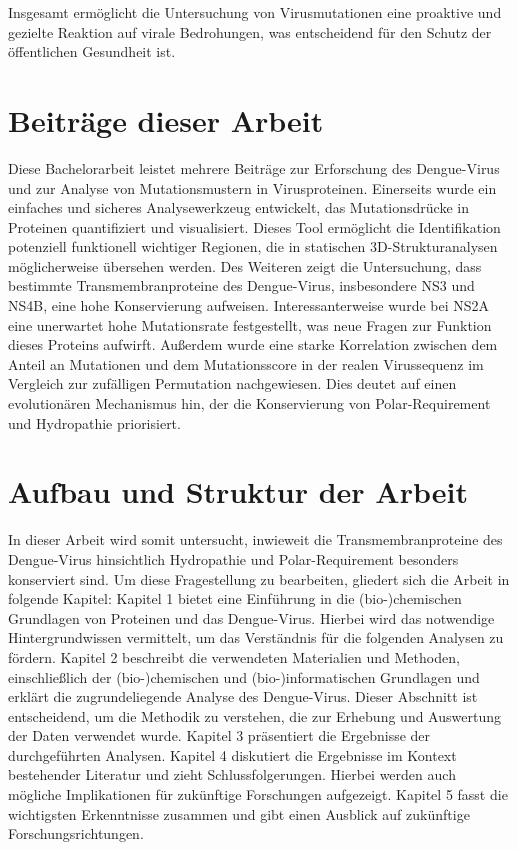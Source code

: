 \documentclass[german,version-2022-01]{uzl-thesis}
\begin{document}
Insgesamt erm\"oglicht die Untersuchung von Virusmutationen eine proaktive und gezielte Reaktion auf virale Bedrohungen, was entscheidend f\"ur den Schutz der \"offentlichen Gesundheit ist.

\section{Beitr\"age dieser Arbeit} 
Diese Bachelorarbeit leistet mehrere Beitr\"age zur Erforschung des Dengue-Virus und zur Analyse von Mutationsmustern in Virusproteinen. Einerseits wurde ein einfaches und sicheres Analysewerkzeug entwickelt, das Mutationsdr\"ucke in Proteinen quantifiziert und visualisiert. Dieses Tool erm\"oglicht die Identifikation potenziell funktionell wichtiger Regionen, die in statischen 3D-Strukturanalysen m\"oglicherweise \"ubersehen werden. Des Weiteren zeigt die Untersuchung, dass bestimmte Transmembranproteine des Dengue-Virus, insbesondere NS3 und NS4B, eine hohe Konservierung aufweisen. Interessanterweise wurde bei NS2A eine unerwartet hohe Mutationsrate festgestellt, was neue Fragen zur Funktion dieses Proteins aufwirft. Au\ss{}erdem wurde eine starke Korrelation zwischen dem Anteil an Mutationen und dem Mutationsscore in der realen Virussequenz im Vergleich zur zuf\"alligen Permutation nachgewiesen. Dies deutet auf einen evolution\"aren Mechanismus hin, der die Konservierung von Polar-Requirement und Hydropathie priorisiert. 

\section{Aufbau und Struktur der Arbeit}
In dieser Arbeit wird somit untersucht, inwieweit die Transmembranproteine des Dengue-Virus hinsichtlich Hydropathie und Polar-Requirement besonders konserviert sind. Um diese Fragestellung zu bearbeiten, gliedert sich die Arbeit in folgende Kapitel: Kapitel 1 bietet eine Einf\"uhrung in die (bio-)chemischen Grundlagen von Proteinen und das Dengue-Virus. Hierbei wird das notwendige Hintergrundwissen vermittelt, um das Verst\"andnis f\"ur die folgenden Analysen zu f\"ordern. Kapitel 2 beschreibt die verwendeten Materialien und Methoden, einschlie\ss{}lich der (bio-)chemischen und (bio-)informatischen Grundlagen und erkl\"art die zugrundeliegende Analyse des Dengue-Virus. Dieser Abschnitt ist entscheidend, um die Methodik zu verstehen, die zur Erhebung und Auswertung der Daten verwendet wurde. Kapitel 3 pr\"asentiert die Ergebnisse der durchgef\"uhrten Analysen. Kapitel 4 diskutiert die Ergebnisse im Kontext bestehender Literatur und zieht Schlussfolgerungen. Hierbei werden auch m\"ogliche Implikationen f\"ur zuk\"unftige Forschungen aufgezeigt. Kapitel 5 fasst die wichtigsten Erkenntnisse zusammen und gibt einen Ausblick auf zuk\"unftige Forschungsrichtungen.
\end{document}
